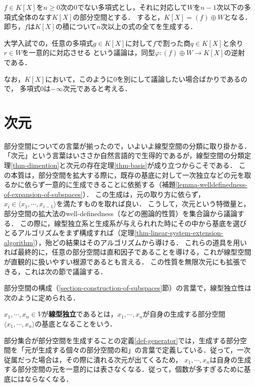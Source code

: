\documentclass[uplatex, 12pt, dvipdfmx]{jsreport}
\begin{document}
\begin{example}
    $f\in K[X]$を$n\ge 0$次の$0$でない多項式とし，それに対応して$W$を$n-1$次以下の多項式全体のなす$K[X]$の部分空間とする．
    すると，$K[X]=(f)\oplus W$となる．即ち，$f$は$K[X]$の積について$n$次以上の式の全てを生成する．

    大学入試での，任意の多項式$g\in K[X]$に対して$f$で割った商$q\in K[X]$と余り$r\in W$を一意的に対応させる
    という議論は，同型$\varphi:(f)\oplus W\to K[X]$の逆射である．
    
    なお，$K[X]$において，このように$0$を別にして議論したい場合ばかりであるので，
    多項式$0$は$-\infty$次元であると考える．
\end{example}

\section{次元}

\begin{screen}
    部分空間についての言葉が揃ったので，いよいよ線型空間の分類に取り掛かる．
    「次元」という言葉はいささか自然言語的で生得的であるが，線型空間の分類定理\ref{thm-dimention}と次元の存在定理\ref{thm-basis}が成り立つからこそである．
    この本質は，部分空間を拡大する際に，既存の基底に対して一次独立などの元を取るかに依らず一意的に生成できることに依拠する（補題\ref{lemma-welldefinedness-of-expansion-of-subspaces}）．
    この生成は，元の取り方に依らず，$x_i\in\langle x_1,\cdots,x_{i-1}\rangle$を満たすものを取れば良い．
    こうして，次元という特徴量と，部分空間の拡大法のwell-definedness（などの圏論的性質）を集合論から議論する．
    この際に，線型独立系と生成系が与えられれた時にその中から基底を選びとるアルゴリズムをまず構成すれば（定理\ref{thm-linear-system-extension-algorithm}），殆どの結果はそのアルゴリズムから導ける．
    これらの道具を用いれば最終的に，任意の部分空間は直和因子であることを導ける，これが線型空間が直観的に扱いやすい根源であるとも言える．
    この性質を無限次元にも拡張できる，これは次の節で議論する．
\end{screen}

部分空間の構成（\ref{section-construction-of-subspaces}節）の言葉で，線型独立性は次のように定められる．
\begin{definition}\label{def-linear-independent}
    $x_1,\cdots,x_n\in V$が\textbf{線型独立}であるとは，$x_1,\cdots,x_n$が自身の生成する部分空間$\langle x_1,\cdots,x_n\rangle$の基底となることをいう．
\end{definition}
\begin{remark}
    部分集合が部分空間を生成することの定義\ref{def-generator}では，生成する部分空間を「元が生成する個々の部分空間の和」の言葉で定義している．従って，一次従属だった場合は，その際に潰れる次元が出てくるため，
    $x_1,\cdots,x_n$は自身の生成する部分空間の元を一意的には表さなくなる．従って，個数が多すぎるために基底にはならなくなる．
\end{remark}
\end{document}

